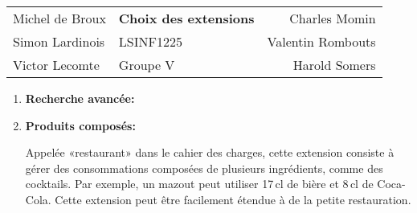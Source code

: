 \documentclass[a4paper,10pt]{article}
\begin{document}

\begin{center}
\begin{tabu} to \textwidth {lX[c]r}
    Michel de Broux & \large{\textbf{Choix des extensions}} & Charles Momin \\
    Simon Lardinois & LSINF1225 & Valentin Rombouts \\
    Victor Lecomte & Groupe V & Harold Somers \\
    \hline
\end{tabu}
\end{center}

\vspace{0.5cm}

\begin{enumerate}
    \item \textbf{Recherche avancée:}
    
    \item \textbf{Produits composés:}
    
    Appelée «restaurant» dans le cahier des charges, cette extension consiste à gérer des consommations composées de plusieurs ingrédients, comme des cocktails. Par exemple, un mazout peut utiliser 17\,cl de bière et 8\,cl de Coca-Cola. Cette extension peut être facilement étendue à de la petite restauration.
\end{enumerate}
\end{document}
